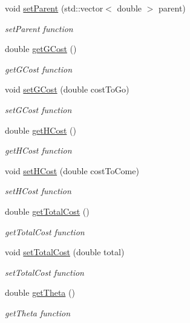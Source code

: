 \begin{DoxyCompactItemize}
void \hyperlink{class_node_param_ad460d4b4ef9d9225ce6f5c8c69b6d1f5}{set\+Parent} (std\+::vector$<$ double $>$ parent)
\begin{DoxyCompactList}\small\item\em set\+Parent function \end{DoxyCompactList}\item 
double \hyperlink{class_node_param_a46aa96e914b2971aa0f2fb9f497bea83}{get\+G\+Cost} ()
\begin{DoxyCompactList}\small\item\em get\+G\+Cost function \end{DoxyCompactList}\item 
void \hyperlink{class_node_param_a75706108ff639d3bf82f264a4dd63de1}{set\+G\+Cost} (double cost\+To\+Go)
\begin{DoxyCompactList}\small\item\em set\+G\+Cost function \end{DoxyCompactList}\item 
double \hyperlink{class_node_param_a052abd98278508034916473f16abd90f}{get\+H\+Cost} ()
\begin{DoxyCompactList}\small\item\em get\+H\+Cost function \end{DoxyCompactList}\item 
void \hyperlink{class_node_param_abdceff8539f713c871b14e0c22b2d7ee}{set\+H\+Cost} (double cost\+To\+Come)
\begin{DoxyCompactList}\small\item\em set\+H\+Cost function \end{DoxyCompactList}\item 
double \hyperlink{class_node_param_a721f207737bd94b350344895a48a9c31}{get\+Total\+Cost} ()
\begin{DoxyCompactList}\small\item\em get\+Total\+Cost function \end{DoxyCompactList}\item 
void \hyperlink{class_node_param_aba159470af0fa4397b29bddfbadbf671}{set\+Total\+Cost} (double total)
\begin{DoxyCompactList}\small\item\em set\+Total\+Cost function \end{DoxyCompactList}\item 
double \hyperlink{class_node_param_af5699295aa1d1bd23c91d7c7504bef32}{get\+Theta} ()
\begin{DoxyCompactList}\small\item\em get\+Theta function \end{DoxyCompactList}\item 

\end{DoxyCompactItemize}
